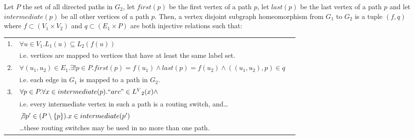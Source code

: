 \begin{defn}
Let $P$ the set of all directed paths in $G_2$, let $first(p)$ be the first vertex of a path $p$, let $last(p)$ be the last vertex of a path $p$ and let $intermediate(p)$ be all other vertices of a path $p$. Then, a vertex disjoint subgraph homeomorphism from $G_1$ to $G_2$ is a tuple $(f, q)$ where $f\subset (V_1 \times V_2)$ and $q \subset (E_1 \times P)$ are both injective relations such that:

\begin{tabular}{rlr}
 1. & $\forall u \in V_1 . L_1(u)\subseteq L_2(f(u))$&\\
 
 &i.e. vertices are mapped to vertices that have at least the same label set.&\\
 
 2. & $\forall (u_1, u_2) \in E_1 . \exists ! p \in P. first(p)=f(u_1) \land last(p)=f(u_2) \land ((u_1, u_2), p) \in q$&\\
 &i.e. each edge in $G_1$ is mapped to a path in $G_2$.&\\
 
 3. & $\forall p \in P . \forall x \in intermediate(p) . ``arc" \in {L^V}_2(x) \land$&\\
 &i.e. every intermediate vertex in such a path is a routing switch, and\dots&\\
    & $\not \exists p' \in (P \setminus \{p\}) . x \in intermediate(p')$&\\
    &\dots these routing switches may be used in no more than one path.&\\
\end{tabular}

\label{def:pathsubgraphisomorphism}
\end{defn}


